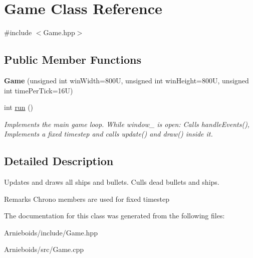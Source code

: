 \hypertarget{class_game}{}\section{Game Class Reference}
\label{class_game}


{\ttfamily \#include $<$Game.\+hpp$>$}

\subsection*{Public Member Functions}
\begin{DoxyCompactItemize}
\item 
\hypertarget{class_game_a5cffde7f7da71cc36bbeabb1861f1a69}{}{\bfseries Game} (unsigned int win\+Width=800\+U, unsigned int win\+Height=800\+U, unsigned int time\+Per\+Tick=16\+U)\label{class_game_a5cffde7f7da71cc36bbeabb1861f1a69}

\item 
\hypertarget{class_game_a99fb161fbbe87d25a8b73265a0611e58}{}int \hyperlink{class_game_a99fb161fbbe87d25a8b73265a0611e58}{run} ()\label{class_game_a99fb161fbbe87d25a8b73265a0611e58}

\begin{DoxyCompactList}\small\item\em Implements the main game loop. While window\+\_\+ is open\+: Calls handle\+Events(), Implements a fixed timestep and calls update() and draw() inside it. \end{DoxyCompactList}\end{DoxyCompactItemize}


\subsection{Detailed Description}
Updates and draws all ships and bullets. Culls dead bullets and ships.

\begin{DoxyRemark}{Remarks}
Chrono members are used for fixed timestep 
\end{DoxyRemark}


The documentation for this class was generated from the following files\+:\begin{DoxyCompactItemize}
\item 
Arnieboids/include/Game.\+hpp\item 
Arnieboids/src/Game.\+cpp\end{DoxyCompactItemize}
